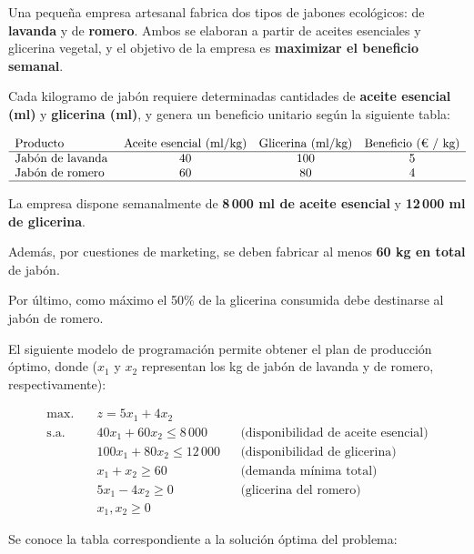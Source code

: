 Una pequeña empresa artesanal fabrica dos tipos de jabones ecológicos: de \textbf{lavanda}  y de \textbf{romero}. Ambos se elaboran a partir de aceites esenciales y glicerina vegetal, y el objetivo de la empresa es \textbf{maximizar el beneficio semanal}.

Cada kilogramo de jabón requiere determinadas cantidades de \textbf{aceite esencial (ml)} y \textbf{glicerina (ml)}, y genera un beneficio unitario según la siguiente tabla:

\[
\begin{array}{lccc}
\text{Producto} & \text{Aceite esencial (ml/kg)} & \text{Glicerina (ml/kg)} & \text{Beneficio (€ / kg)} \\
\hline
\text{Jabón de lavanda } & 40 & 100 & 5 \\
\text{Jabón de romero }  & 60 & 80  & 4 \\
\hline
\end{array}
\]

La empresa dispone semanalmente de \textbf{8\,000 ml de aceite esencial} y \textbf{12\,000 ml de glicerina}. 

Además, por cuestiones de marketing, se deben fabricar al menos \textbf{60 kg en total} de jabón.

Por último, como máximo el 50\% de la glicerina consumida debe destinarse al jabón de romero.

El siguiente modelo de programación permite obtener el plan de producción óptimo, donde ($x_1$ y $x_2$ representan los kg de jabón de lavanda y de romero, respectivamente):

\[
\begin{aligned}
\mbox{max.} \quad & z = 5x_1 + 4x_2 \\
\text{s.a.} \quad 
& 40x_1 + 60x_2 \le 8\,000 & & \text{(disponibilidad de aceite esencial)} \\
& 100x_1 + 80x_2 \le 12\,000 & & \text{(disponibilidad de glicerina)} \\
& x_1 + x_2 \ge 60 & & \text{(demanda mínima total)} \\
& 5x_1 - 4x_2 \ge 0 & & \text{(glicerina del romero)} \\
& x_1, x_2 \ge 0
\end{aligned}
\]

Se conoce la tabla correspondiente a la solución óptima del problema:



